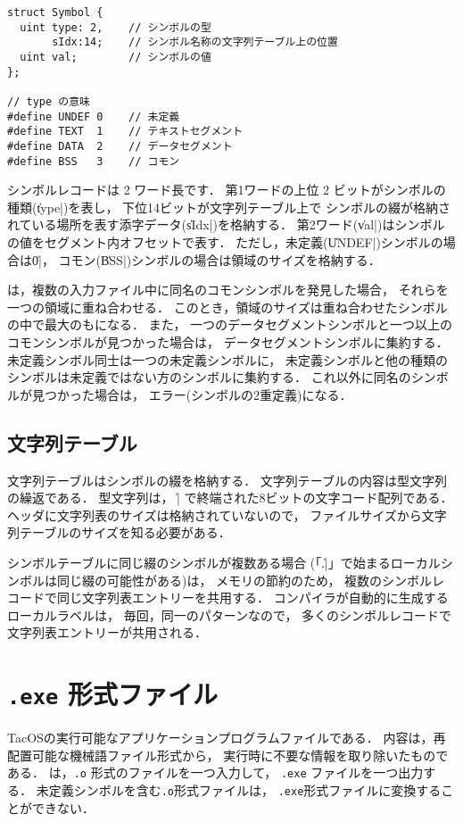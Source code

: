 \begin{lstlisting}[numbers=none,float=htb]
struct Symbol {
  uint type: 2,    // シンボルの型
       sIdx:14;    // シンボル名称の文字列テーブル上の位置
  uint val;        // シンボルの値
};

// type の意味
#define UNDEF 0    // 未定義
#define TEXT  1    // テキストセグメント
#define DATA  2    // データセグメント
#define BSS   3    // コモン
\end{lstlisting}

シンボルレコードは 2 ワード長です．
第1ワードの上位 2 ビットがシンボルの種類(\|type|)を表し，
下位14ビットが文字列テーブル上で
シンボルの綴が格納されている場所を表す添字データ(\|sIdx|)を格納する．
第2ワード(\|val|)はシンボルの値をセグメント内オフセットで表す．
ただし，未定義(\|UNDEF|)シンボルの場合は\|0|，
コモン(\|BSS|)シンボルの場合は領域のサイズを格納する．

{\ld}は，複数の入力ファイル中に同名のコモンシンボルを発見した場合，
それらを一つの領域に重ね合わせる．
このとき，領域のサイズは重ね合わせたシンボルの中で最大のもになる．
また，
一つのデータセグメントシンボルと一つ以上のコモンシンボルが見つかった場合は，
データセグメントシンボルに集約する．
未定義シンボル同士は一つの未定義シンボルに，
未定義シンボルと他の種類のシンボルは未定義ではない方のシンボルに集約する．
これ以外に同名のシンボルが見つかった場合は，
エラー(シンボルの2重定義)になる．

\subsection{文字列テーブル}
文字列テーブルはシンボルの綴を格納する．
文字列テーブルの内容は{\cmml}型文字列の繰返である．
{\cmml}型文字列は， \|\0| で終端された8ビットの文字コード配列である．
ヘッダに文字列表のサイズは格納されていないので，
ファイルサイズから文字列テーブルのサイズを知る必要がある．

シンボルテーブルに同じ綴のシンボルが複数ある場合
(「\|.|」で始まるローカルシンボルは同じ綴の可能性がある)は，
メモリの節約のため，
複数のシンボルレコードで同じ文字列表エントリーを共用する．
{\cmm}コンパイラが自動的に生成するローカルラベルは，
毎回，同一のパターンなので，
多くのシンボルレコードで文字列表エントリーが共用される．

\section{\texttt{.exe} 形式ファイル}
TacOSの実行可能なアプリケーションプログラムファイルである．
内容は，再配置可能な機械語ファイル形式から，
実行時に不要な情報を取り除いたものである．
{\objexe}は，\texttt{.o} 形式のファイルを一つ入力して，
\texttt{.exe} ファイルを一つ出力する．
未定義シンボルを含む\texttt{.o}形式ファイルは，
\texttt{.exe}形式ファイルに変換することができない．

